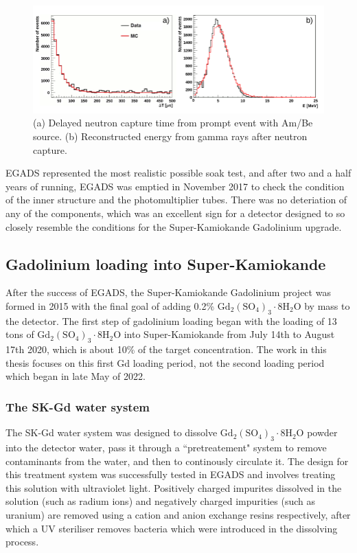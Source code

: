 \begin{figure}[H]
    \includegraphics[width=\textwidth]{Figures/egads_ambe.png}
\caption{(a) Delayed neutron capture time from prompt event with Am/Be source. (b) Reconstructed energy from gamma rays after neutron capture.}
\label{fig:EGADS_ambe_capture}
\end{figure}


EGADS represented the most realistic possible soak test, and after two and a half years of running, EGADS was emptied in November 2017 to check the condition of the inner structure and the photomultiplier tubes. There was no deteriation of any of the components, which was an excellent sign for a detector designed to so closely resemble the conditions for the Super-Kamiokande Gadolinium upgrade. 

\subsection{Gadolinium loading into Super-Kamiokande}

After the success of EGADS, the Super-Kamiokande Gadolinium project was formed in 2015 with the final goal of adding 0.2\% $\mathrm{Gd}_{2}\left(\mathrm{SO}_{4}\right)_{3} \cdot 8 \mathrm{H}_{2} \mathrm{O}$ by mass to the detector. The first step of gadolinium loading began with the loading of 13 tons of $\mathrm{Gd}_{2}\left(\mathrm{SO}_{4}\right)_{3} \cdot 8 \mathrm{H}_{2} \mathrm{O}$ into Super-Kamiokande from July 14th to August 17th 2020, which is about 10\% of the target concentration. The work in this thesis focuses on this first Gd loading period, not the second loading period which began in late May of 2022. 

\subsubsection{The SK-Gd water system}

The SK-Gd water system was designed to dissolve $\mathrm{Gd}_{2}\left(\mathrm{SO}_{4}\right)_{3} \cdot 8 \mathrm{H}_{2} \mathrm{O}$ powder into the detector water, pass it through a ``pretreatement" system to remove contaminants from the water, and then to continously circulate it. The design for this treatment system was successfully tested in EGADS and involves treating this solution with ultraviolet light. Positively charged impurites dissolved in the solution (such as radium ions) and negatively charged impurities (such as uranium) are removed using a cation and anion exchange resins respectively, after which a UV steriliser removes bacteria which were introduced in the dissolving process. 

